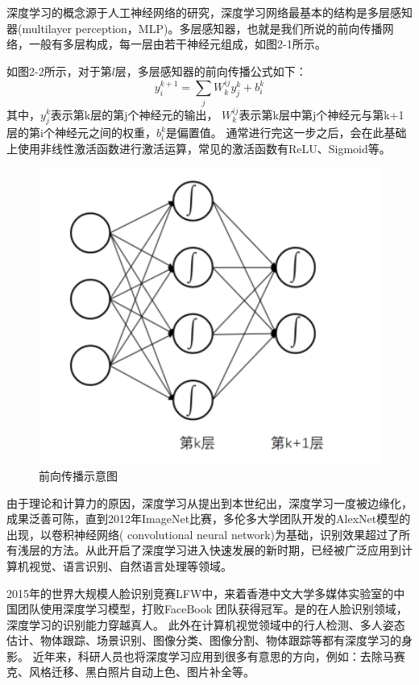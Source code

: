 深度学习的概念源于人工神经网络的研究，深度学习网络最基本的结构是多层感知器(multilayer perception，MLP)。多层感知器，也就是我们所说的前向传播网络，一般有多层构成，每一层由若干神经元组成，如图2-1所示。



如图2-2所示，对于第$l$层，多层感知器的前向传播公式如下：
\begin{equation}
y_{i}^{k+1} = \sum_{j}W_{k}^{ij}y_{j}^{k}+b_{i}^{k}
\end{equation}
其中，$y_{j}^{k}$表示第k层的第j个神经元的输出，
$W_{k}^{ij}$表示第k层中第j个神经元与第k+1层的第i个神经元之间的权重，$b_{i}^{k}$是偏置值。
通常进行完这一步之后，会在此基础上使用非线性激活函数进行激活运算，常见的激活函数有ReLU、Sigmoid等。

\begin{figure}[h]
\begin{center}
\includegraphics[width=1\textwidth]{figures/CNN01.png}
\end{center}
\vspace{-5mm}
\caption{前向传播示意图}
\end{figure}
由于理论和计算力的原因，深度学习从提出到本世纪出，深度学习一度被边缘化，成果泛善可陈，直到2012年ImageNet比赛，多伦多大学团队开发的AlexNet模型的出现，以卷积神经网络( convolutional neural network)为基础，识别效果超过了所有浅层的方法。从此开启了深度学习进入快速发展的新时期，已经被广泛应用到计算机视觉、语言识别、自然语言处理等领域。

2015年的世界大规模人脸识别竞赛LFW中，来着香港中文大学多媒体实验室的中国团队使用深度学习模型，打败FaceBook 团队获得冠军。是的在人脸识别领域，深度学习的识别能力穿越真人。
此外在计算机视觉领域中的行人检测、多人姿态估计、物体跟踪、场景识别、图像分类、图像分割、物体跟踪等都有深度学习的身影。
近年来，科研人员也将深度学习应用到很多有意思的方向，例如：去除马赛克、风格迁移、黑白照片自动上色、图片补全等。

